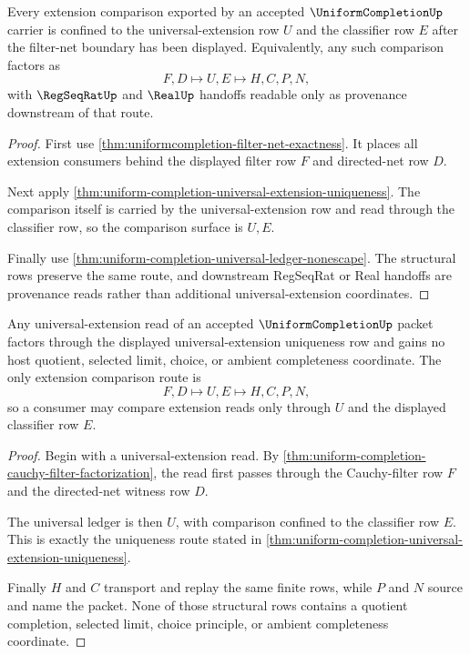 \begin{theorem}
\label{thm:uniformcompletion-universal-extension-scope}
Every extension comparison exported by an accepted $\UniformCompletionUp$ carrier is confined to the universal-extension row $U$ and the classifier row $E$ after the filter-net boundary has been displayed. Equivalently, any such comparison factors as
$$
F,D \longmapsto U,E \longmapsto H,C,P,N ,
$$
with $\RegSeqRatUp$ and $\RealUp$ handoffs readable only as provenance downstream of that route.
\end{theorem}
\begin{proof}
First use \autoref{thm:uniformcompletion-filter-net-exactness}. It places all extension consumers behind the displayed filter row $F$ and directed-net row $D$.

Next apply \autoref{thm:uniform-completion-universal-extension-uniqueness}. The comparison itself is carried by the universal-extension row and read through the classifier row, so the comparison surface is $U,E$.

Finally use \autoref{thm:uniform-completion-universal-ledger-nonescape}. The structural rows preserve the same route, and downstream RegSeqRat or Real handoffs are provenance reads rather than additional universal-extension coordinates.
\end{proof}

\begin{theorem}
\label{thm:uniform-completion-universal-ledger-nonescape}
Any universal-extension read of an accepted $\UniformCompletionUp$ packet factors through the displayed universal-extension uniqueness row and gains no host quotient, selected limit, choice, or ambient completeness coordinate. The only extension comparison route is
$$
F,D \longmapsto U,E \longmapsto H,C,P,N ,
$$
so a consumer may compare extension reads only through $U$ and the displayed classifier row $E$.
\end{theorem}
\begin{proof}
Begin with a universal-extension read. By \autoref{thm:uniform-completion-cauchy-filter-factorization}, the read first passes through the Cauchy-filter row $F$ and the directed-net witness row $D$.

The universal ledger is then $U$, with comparison confined to the classifier row $E$. This is exactly the uniqueness route stated in \autoref{thm:uniform-completion-universal-extension-uniqueness}.

Finally $H$ and $C$ transport and replay the same finite rows, while $P$ and $N$ source and name the packet. None of those structural rows contains a quotient completion, selected limit, choice principle, or ambient completeness coordinate.
\end{proof}

